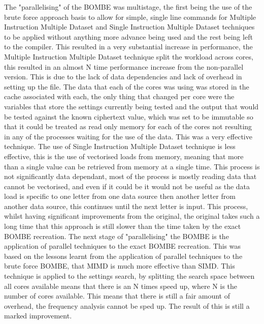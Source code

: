 \documentclass[12pt,a4paper]{article}
\begin{document}
The "parallelising" of the BOMBE was multistage, the first being the use of the brute force approach basis to allow for simple, single line commands for Multiple Instruction Multiple Dataset and Single Instruction Multiple Dataset techniques to be applied without anything more advance being used and the rest being left to the compiler. This resulted in a very substantial increase in performance, the Multiple Instruction Multiple Dataset technique split the workload across cores, this resulted in an almost N time performance increase from the non-parallel version. This is due to the lack of data dependencies and lack of overhead in setting up the file. The data that each of the cores was using was stored in the cache associated with each, the only thing that changed per core were the variables that store the settings currently being tested and the output that would be tested against the known ciphertext value, which was set to be immutable so that it could be treated as read only memory for each of the cores not resulting in any of the processes waiting for the use of the data. This was a very effective technique. The use of Single Instruction Multiple Dataset technique is less effective, this is the use of vectorised loads from memory, meaning that more than a single value can be retrieved from memory at a single time. This process is not significantly data dependant, most of the process is mostly reading data that cannot be vectorised, and even if it could be it would not be useful as the data load is specific to one letter from one data source then another letter from another data source, this continues until the next letter is input. This process, whilst having significant improvements from the original, the original takes such a long time that this approach is still slower than the time taken by the exact BOMBE recreation. The next stage of "parallelising" the BOMBE is the application of parallel techniques to the exact BOMBE recreation. This was based on the lessons learnt from the application of parallel techniques to the brute force BOMBE, that MIMD is much more effective than SIMD. This technique is applied to the settings search, by splitting the search space between all cores available means that there is an N times speed up, where N is the number of cores available. This means that there is still a fair amount of overhead, the frequency analysis cannot be sped up. The result of this is still a marked improvement.\\
\end{document}
